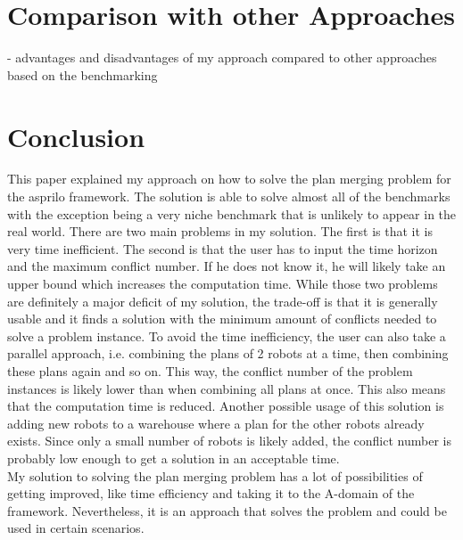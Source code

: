 \documentclass[runningheads]{llncs}
\begin{document}
\section{Comparison with other Approaches}
 - advantages and disadvantages of my approach compared to other approaches based on the benchmarking

\section{Conclusion}
This paper explained my approach on how to solve the plan merging problem for the asprilo framework. The solution is able to solve almost all of the benchmarks with the exception being a very niche 
benchmark that is unlikely to appear in the real world. There are two main problems in my solution. The first is that it is very time inefficient. The second is that the user has to input the time horizon and
the maximum conflict number. If he does not know it, he will likely take an upper bound which increases the computation time. While those two problems are definitely a major deficit of my solution, the trade-off
is that it is generally usable and it finds a solution with the minimum amount of conflicts needed to solve a problem instance. To avoid the time inefficiency, the user can also take a parallel approach, i.e. combining 
the plans of 2 robots at a time, then combining these plans again and so on. This way, the conflict number of the problem instances is likely lower than when combining all plans at once. This also means that the computation time
is reduced. Another possible usage of this solution is adding new robots to a warehouse where a plan for the other robots already exists. Since only a small number of robots is likely added, the conflict number is probably low
enough to get a solution in an acceptable time. \\
My solution to solving the plan merging problem has a lot of possibilities of getting improved, like time efficiency and taking it to the A-domain of the framework. Nevertheless, it is an approach that solves the problem and could
be used in certain scenarios.

\newpage
\end{document}
